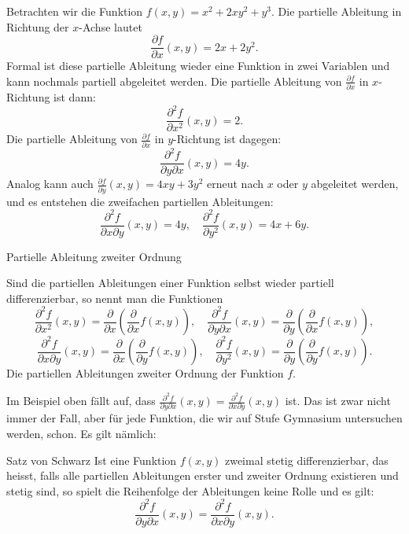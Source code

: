 Betrachten wir die Funktion \(f(x,y) = x^2 + 2xy^2 + y^3\). Die partielle Ableitung in Richtung der \(x\)-Achse lautet
\[
	\frac{\partial f}{\partial x}(x,y) = 2x + 2y^2.
\]
Formal ist diese partielle Ableitung wieder eine Funktion in zwei Variablen und kann nochmals partiell abgeleitet werden. Die partielle Ableitung von \(\frac{\partial f}{\partial x}\) in \(x\)-Richtung ist dann:
\[
	\frac{\partial^2 f}{\partial x^2}(x,y) = 2.
\]
Die partielle Ableitung von \(\frac{\partial f}{\partial x}\) in \(y\)-Richtung ist dagegen:
\[
	\frac{\partial^2 f}{\partial y \partial x}(x,y) = 4y.
\]
Analog kann auch \(\frac{\partial f}{\partial y}(x,y) = 4xy + 3y^2\) erneut nach \(x\) oder \(y\) abgeleitet werden, und es entstehen die zweifachen partiellen Ableitungen:
\[
	\frac{\partial^2 f}{\partial x \partial y}(x,y) = 4y, \quad \frac{\partial^2 f}{\partial y^2}(x,y) = 4x + 6y.
\]


\begin{definition}
	{Partielle Ableitung zweiter Ordnung}{}

	Sind die partiellen Ableitungen einer Funktion selbst wieder partiell differenzierbar, so nennt man die Funktionen
	\[
		\frac{\partial^2 f}{\partial x^2}(x,y) = \frac{\partial}{\partial x} \left( \frac{\partial}{\partial x} f(x,y) \right), \quad
		\frac{\partial^2 f}{\partial y \partial x}(x,y) =\frac{\partial}{\partial y} \left( \frac{\partial}{\partial x} f(x,y) \right),
	\]
	\[
		\frac{\partial^2 f}{\partial x \partial y}(x,y)= \frac{\partial}{\partial x} \left( \frac{\partial}{\partial y} f(x,y) \right), \quad
		\frac{\partial^2 f}{\partial y^2}(x,y)= \frac{\partial}{\partial y} \left( \frac{\partial}{\partial y} f(x,y) \right).
	\]
	Die partiellen Ableitungen zweiter Ordnung der Funktion \(f\).
\end{definition}

Im Beispiel oben fällt auf, dass \(\frac{\partial^2 f}{\partial y \partial x}(x,y) = \frac{\partial^2 f}{\partial x \partial y}(x,y)\) ist. Das ist zwar nicht immer der Fall, aber für jede Funktion, die wir auf Stufe Gymnasium untersuchen werden, schon. Es gilt nämlich:

\clearpage

\begin{satz}
	{Satz von Schwarz}{}
	Ist eine Funktion \(f(x,y)\) zweimal stetig differenzierbar, das heisst, falls alle partiellen Ableitungen erster und zweiter Ordnung existieren und stetig sind, so spielt die Reihenfolge der Ableitungen keine Rolle und es gilt:
	\[
		\frac{\partial^2 f}{\partial y \partial x}(x,y) = \frac{\partial^2 f}{\partial x \partial y}(x,y).
	\]
\end{satz}

